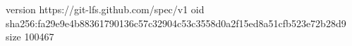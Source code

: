 version https://git-lfs.github.com/spec/v1
oid sha256:fa29e9e4b88361790136c57c32904c53c3558d0a2f15ed8a51cfb523e72b28d9
size 100467
